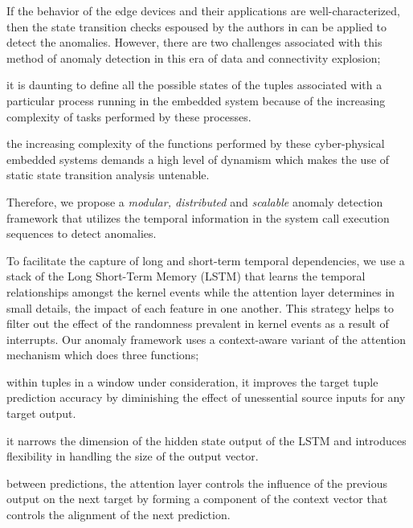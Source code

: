 \par  
If the behavior of the edge devices and their 
applications are 
well-characterized, then the state transition checks espoused 
by the authors in 
\cite{sumner2013comparative,li2017locating} can be applied to 
detect the 
anomalies. However, there are two challenges associated with 
this method of 
anomaly detection in this era of data and connectivity 
explosion; 
\begin{enumerate*}[label={\alph*)},font={\bfseries}]
	\item it is daunting to define all the possible states of 
	the tuples 
	associated with a particular process running in the 
	embedded system because 
	of the increasing complexity of tasks performed by these 
	processes.
	\item the increasing complexity of the functions  
	performed by these cyber-physical embedded systems 
	demands a high level of 
	dynamism which makes the use of static state transition 
	analysis untenable.
\end{enumerate*}  
Therefore, we propose a \emph{modular, distributed} and 
\emph{scalable} 
anomaly detection framework that utilizes the temporal 
information in the system 
call execution sequences to detect anomalies. 
\par  
To facilitate the capture of long and short-term temporal 
dependencies, we use 
a stack of the Long Short-Term Memory (LSTM) 
\cite{hochreiter1997long} that learns the temporal 
relationships 
amongst the kernel events while the 
attention layer determines in small details, the impact of 
each feature in one 
another. This strategy helps to filter out the effect of the 
randomness 
prevalent in kernel events as a result of interrupts. Our 
anomaly framework uses a 
context-aware variant of the attention mechanism which does 
three functions; 
\begin{enumerate*}[label={\alph*)},font={\bfseries}]
	\item within tuples in a window under consideration, it 
	improves the target 
	tuple prediction accuracy by diminishing the effect of 
	unessential source 
	inputs for any target output.
	\item it narrows the dimension of the hidden state output 
	of the LSTM and 
	introduces flexibility in handling the size of the output 
	vector.
	\item between predictions, the attention layer controls 
	the influence of 
	the previous output on the next target by forming a 
	component of the 
	context vector that controls the alignment of the next 
	prediction.
\end{enumerate*}
